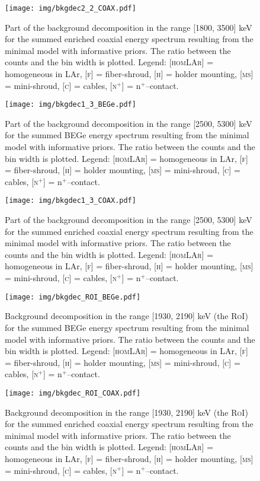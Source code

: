 \begin{landscape}
\begin{figure}
	\end{figure}
	\begin{figure}
		\centering
		\texttt{[image: img/bkgdec2\_2\_COAX.pdf]}
		\caption{Part of the background decomposition in the range [1800, 3500] keV for the summed enriched coaxial energy spectrum resulting from the minimal model with informative priors. The ratio between the counts and the bin width is plotted. Legend: \textsc{[homLAr]} = homogeneous in LAr, \textsc{[f]} = fiber-shroud, \textsc{[h]} = holder mounting, \textsc{[ms]} = mini-shroud, \textsc{[c]} = cables, \textsc{[n$^+$]} = n$^+$--contact.}
	\end{figure}
	\begin{figure}
		\centering
		\texttt{[image: img/bkgdec1\_3\_BEGe.pdf]}
		\caption{Part of the background decomposition in the range [2500, 5300] keV for the summed BEGe energy spectrum resulting from the minimal model with informative priors. The ratio between the counts and the bin width is plotted. Legend: \textsc{[homLAr]} = homogeneous in LAr, \textsc{[f]} = fiber-shroud, \textsc{[h]} = holder mounting, \textsc{[ms]} = mini-shroud, \textsc{[c]} = cables, \textsc{[n$^+$]} = n$^+$--contact.}
	\end{figure}
	\begin{figure}
		\centering
		\texttt{[image: img/bkgdec1\_3\_COAX.pdf]}
		\caption{Part of the background decomposition in the range [2500, 5300] keV for the summed enriched coaxial energy spectrum resulting from the minimal model with informative priors. The ratio between the counts and the bin width is plotted. Legend: \textsc{[homLAr]} = homogeneous in LAr, \textsc{[f]} = fiber-shroud, \textsc{[h]} = holder mounting, \textsc{[ms]} = mini-shroud, \textsc{[c]} = cables, \textsc{[n$^+$]} = n$^+$--contact.}
	\end{figure}
	\begin{figure}
		\centering
		\texttt{[image: img/bkgdec\_ROI\_BEGe.pdf]}
		\caption{Background decomposition in the range [1930, 2190] keV (the \textsc{RoI}) for the summed BEGe energy spectrum resulting from the minimal model with informative priors. The ratio between the counts and the bin width is plotted. Legend: \textsc{[homLAr]} = homogeneous in LAr, \textsc{[f]} = fiber-shroud, \textsc{[h]} = holder mounting, \textsc{[ms]} = mini-shroud, \textsc{[c]} = cables, \textsc{[n$^+$]} = n$^+$--contact.}
	\end{figure}
	\begin{figure}
		\centering
		\texttt{[image: img/bkgdec\_ROI\_COAX.pdf]}
		\caption{Background decomposition in the range [1930, 2190] keV (the \textsc{RoI}) for the summed enriched coaxial energy spectrum resulting from the minimal model with informative priors. The ratio between the counts and the bin width is plotted. Legend: \textsc{[homLAr]} = homogeneous in LAr, \textsc{[f]} = fiber-shroud, \textsc{[h]} = holder mounting, \textsc{[ms]} = mini-shroud, \textsc{[c]} = cables, \textsc{[n$^+$]} = n$^+$--contact.}
	\end{figure}
\end{landscape}
\restoregeometry
